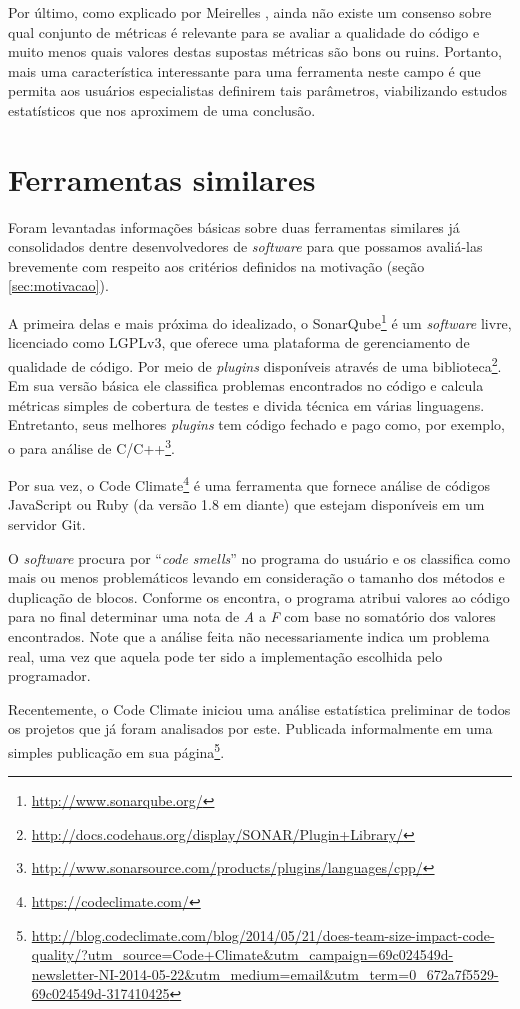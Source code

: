 \documentclass{llncs}
\begin{document}
Por último, como explicado por Meirelles \cite{meirelles2013monitoramento}, ainda não existe um consenso sobre qual conjunto de métricas é relevante para se avaliar a qualidade do código e muito menos quais valores destas supostas métricas são bons ou ruins. Portanto, mais uma característica interessante para uma ferramenta neste campo é que permita aos usuários especialistas definirem tais parâmetros, viabilizando estudos estatísticos que nos aproximem de uma conclusão.

\section{Ferramentas similares}
Foram levantadas informações básicas sobre duas ferramentas similares já consolidados dentre desenvolvedores de \textit{software} para que possamos avaliá-las brevemente com respeito aos critérios definidos na motivação (seção \ref{sec:motivacao}).

A primeira delas e mais próxima do idealizado, o SonarQube\footnote{\url{http://www.sonarqube.org/}} é um \textit{software} livre, licenciado como LGPLv3, que oferece uma plataforma de gerenciamento de qualidade de código. Por meio de \textit{plugins} disponíveis através de uma biblioteca\footnote{\url{http://docs.codehaus.org/display/SONAR/Plugin+Library/}}. Em sua versão básica ele classifica problemas encontrados no código e calcula métricas simples de cobertura de testes e divida técnica em várias linguagens. Entretanto, seus melhores \textit{plugins} tem código fechado e pago como, por exemplo, o para análise de C/C++\footnote{\url{http://www.sonarsource.com/products/plugins/languages/cpp/}}.

Por sua vez, o Code Climate\footnote{\url{https://codeclimate.com/}} é uma ferramenta que fornece análise de códigos JavaScript ou Ruby (da versão 1.8 em diante) que estejam disponíveis em um servidor Git.

O \textit{software} procura por ``\textit{code smells}'' no programa do usuário e os classifica como mais ou menos problemáticos levando em consideração o tamanho dos métodos e duplicação de blocos. Conforme os encontra, o programa atribui valores ao código para no final determinar uma nota de \textit{A} a \textit{F} com base no somatório dos valores encontrados. Note que a análise feita não necessariamente indica um problema real, uma vez que aquela pode ter sido a implementação escolhida pelo programador.

Recentemente, o Code Climate iniciou uma análise estatística preliminar de todos os projetos que já foram analisados por este. Publicada informalmente em uma simples publicação em sua página\footnote{\url{http://blog.codeclimate.com/blog/2014/05/21/does-team-size-impact-code-quality/?utm\_source=Code+Climate&utm\_campaign=69c024549d-newsletter-NI-2014-05-22&utm\_medium=email&utm\_term=0\_672a7f5529-69c024549d-317410425}}.
\end{document}
